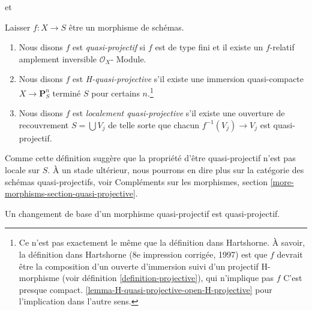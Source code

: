 \begin{definition}

\label{definition-quasi-projective}

\begin{reference}

\cite[II, définition 5.3.1]{EGA} et \cite[page 103]{H}

\end{reference}

Laisser $f : X \to S$ être un morphisme de schémas.

\begin{enumerate}

\item Nous disons $f$ est {\it quasi-projectif} si $f$ est de type fini et il existe un $f$-relatif amplement inversible $\mathcal{O}_X$- Module.
\item Nous disons $f$ est {\it H-quasi-projective} s'il existe une immersion quasi-compacte $X \to \mathbf{P}^n_S$ terminé $S$ pour certains
$n$.\footnote{Ce n'est pas exactement le même que la définition dans Hartshorne. À savoir, la définition dans Hartshorne (8e impression corrigée, 1997) est que
$f$ devrait être la composition d'un ouverte d'immersion suivi d'un projectif H-morphisme (voir définition \ref{definition-projective}), qui n'implique pas
$f$ C'est presque compact. \ref{lemma-H-quasi-projective-open-H-projective} pour l'implication dans l'autre sens.}
\item Nous disons $f$ est {\it localement quasi-projective} s'il existe une ouverture de recouvrement $S = \bigcup V_j$ de telle sorte que chacun $f^{-1}(V_j) \to V_j$
est quasi-projectif.

\end{enumerate}

\end{definition}

\noindent
Comme cette définition suggère que la propriété d'être quasi-projectif n'est pas locale sur $S$. À un stade ultérieur, nous pourrons en dire plus sur la catégorie des schémas quasi-projectifs, voir Compléments sur les morphismes, section \ref{more-morphisms-section-quasi-projective}.

\begin{lemma}

\label{lemma-base-change-quasi-projective}

Un changement de base d'un morphisme quasi-projectif est quasi-projectif.

\end{lemma}

